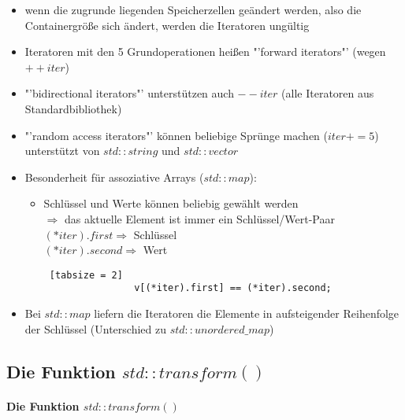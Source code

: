 \documentclass{article}
\begin{document}
\begin{itemize}
\begin{lstlisting} [tabsize = 2]
				// Abkuerzung in C++: rang-based for-loop
				for (int & element : v) {
					int current = element;  // lesen
					element = new_value;  // schreiben
				}
			}
		\end{lstlisting}
		\item wenn die zugrunde liegenden Speicherzellen geändert werden, also die Containergröße sich ändert, werden die Iteratoren ungültig
		\item Iteratoren mit den 5 Grundoperationen heißen "'forward iterators"' (wegen $++iter$)
		\item "'bidirectional iterators"' unterstützen auch $--iter$ (alle Iteratoren aus Standardbibliothek)
		\item "'random access iterators"' können beliebige Sprünge machen ($iter+=5$) \\
		unterstützt von $std::string$ und $std::vector$
		\item Besonderheit für assoziative Arrays ($std::map$):
		\begin{itemize}
			\item Schlüssel und Werte können beliebig gewählt werden \\
			$\Rightarrow$ das aktuelle Element ist immer ein Schlüssel/Wert-Paar \\
			$(*iter).first \Rightarrow$ Schlüssel \\
			$(*iter).second \Rightarrow$ Wert
			\begin{lstlisting} [tabsize = 2]
				v[(*iter).first] == (*iter).second;
			\end{lstlisting}
		\end{itemize}
		\item Bei $std::map$ liefern die Iteratoren die Elemente in aufsteigender Reihenfolge der Schlüssel (Unterschied zu $std::unordered\_map$)
	\end{itemize}
	
	\subsection{Die Funktion $std::transform()$}

	\paragraph{Die Funktion $std::transform()$}
	
\end{document}
